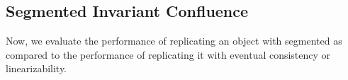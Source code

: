 
\subsection{Segmented Invariant Confluence}%
Now, we evaluate the performance of replicating an object with segmented
\invariantconfluence{} as compared to the performance of replicating it with
eventual consistency or linearizability.



